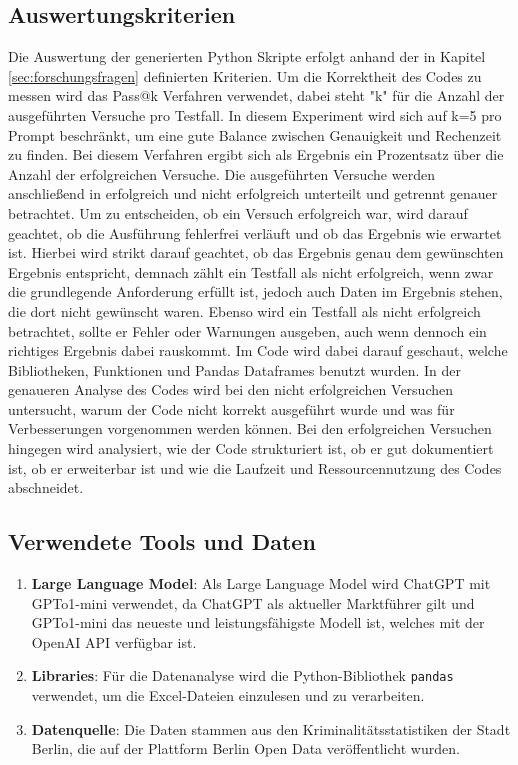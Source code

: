 \documentclass[11pt,a4paper]{article}
\begin{document}
\subsection{Auswertungskriterien}
\label{sec:auswertungskriterien}
    Die Auswertung der generierten Python Skripte erfolgt anhand der in Kapitel \ref{sec:forschungsfragen} definierten Kriterien. Um die Korrektheit des Codes zu messen wird das Pass@k Verfahren verwendet, dabei steht "k" für die Anzahl der ausgeführten Versuche pro Testfall. In diesem Experiment wird sich auf k=5 pro Prompt beschränkt, um eine gute Balance zwischen Genauigkeit und Rechenzeit zu finden. Bei diesem Verfahren ergibt sich als Ergebnis ein Prozentsatz über die Anzahl der erfolgreichen Versuche. Die ausgeführten Versuche werden anschließend in erfolgreich und nicht erfolgreich unterteilt und getrennt genauer betrachtet. Um zu entscheiden, ob ein Versuch erfolgreich war, wird darauf geachtet, ob die Ausführung fehlerfrei verläuft und ob das Ergebnis wie erwartet ist. Hierbei wird strikt darauf geachtet, ob das Ergebnis genau dem gewünschten Ergebnis entspricht, demnach zählt ein Testfall als nicht erfolgreich, wenn zwar die grundlegende Anforderung erfüllt ist, jedoch auch Daten im Ergebnis stehen, die dort nicht gewünscht waren. Ebenso wird ein Testfall als nicht erfolgreich betrachtet, sollte er Fehler oder Warnungen ausgeben, auch wenn dennoch ein richtiges Ergebnis dabei rauskommt. Im Code wird dabei darauf geschaut, welche Bibliotheken, Funktionen und Pandas Dataframes benutzt wurden.
    In der genaueren Analyse des Codes wird bei den nicht erfolgreichen Versuchen untersucht, warum der Code nicht korrekt ausgeführt wurde und was für Verbesserungen vorgenommen werden können. Bei den erfolgreichen Versuchen hingegen wird analysiert, wie der Code strukturiert ist, ob er gut dokumentiert ist, ob er erweiterbar ist und wie die Laufzeit und Ressourcennutzung des Codes abschneidet.

\subsection{Verwendete Tools und Daten}
    \begin{enumerate}
        \item \textbf{Large Language Model}: Als Large Language Model wird ChatGPT mit GPTo1-mini verwendet, da ChatGPT als aktueller Marktführer gilt und GPTo1-mini das neueste und leistungsfähigste Modell ist, welches mit der OpenAI API verfügbar ist.
        \item \textbf{Libraries}: Für die Datenanalyse wird die Python-Bibliothek \texttt{pandas} verwendet, um die Excel-Dateien einzulesen und zu verarbeiten.
        \item \textbf{Datenquelle}: Die Daten stammen aus den Kriminalitätsstatistiken der Stadt Berlin, die auf der Plattform Berlin Open Data veröffentlicht wurden.
    \end{enumerate}
\end{document}
